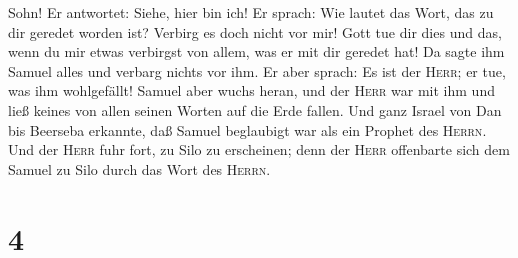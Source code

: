 Sohn! Er antwortet: Siehe, hier bin ich!  Er sprach: Wie
lautet das Wort, das zu dir geredet worden ist? Verbirg es doch nicht
vor mir! Gott tue dir dies und das, wenn du mir etwas verbirgst von
allem, was er mit dir geredet hat!  Da sagte ihm Samuel
alles und verbarg nichts vor ihm. Er aber sprach: Es ist der
\textsc{Herr}; er tue, was ihm wohlgefällt!  Samuel aber
wuchs heran, und der \textsc{Herr} war mit ihm und ließ keines von allen
seinen Worten auf die Erde fallen.  Und ganz Israel von
Dan bis Beerseba erkannte, daß Samuel beglaubigt war als ein Prophet des
\textsc{Herrn}.  Und der \textsc{Herr} fuhr fort, zu Silo
zu erscheinen; denn der \textsc{Herr} offenbarte sich dem Samuel zu Silo
durch das Wort des \textsc{Herrn}.

\hypertarget{section-3}{%
\section{4}\label{section-3}}

